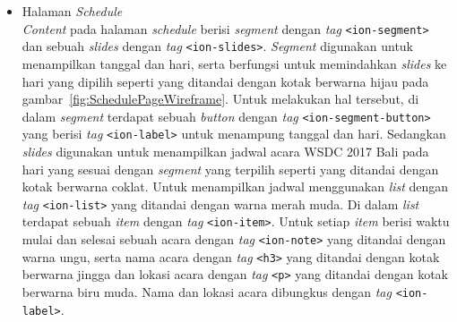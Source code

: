 \begin{enumerate}
\begin{itemize}
				\item Halaman \textit{Schedule} \\
					\textit{Content} pada halaman \textit{schedule} berisi \textit{segment} dengan \textit{tag} \texttt{<ion-segment>} dan sebuah \textit{slides} dengan \textit{tag} \texttt{<ion-slides>}. \textit{Segment} digunakan untuk menampilkan tanggal dan hari, serta berfungsi untuk memindahkan \textit{slides} ke hari yang dipilih seperti yang ditandai dengan kotak berwarna hijau pada gambar~\ref{fig:SchedulePageWireframe}. Untuk melakukan hal tersebut, di dalam \textit{segment} terdapat sebuah \textit{button} dengan \textit{tag} \texttt{<ion-segment-button>} yang berisi \textit{tag} \texttt{<ion-label>} untuk menampung tanggal dan hari. 
					Sedangkan \textit{slides} digunakan untuk menampilkan jadwal acara WSDC 2017 Bali pada hari yang sesuai dengan \textit{segment} yang terpilih seperti yang ditandai dengan kotak berwarna coklat. Untuk menampilkan jadwal menggunakan \textit{list} dengan \textit{tag} \texttt{<ion-list>} yang ditandai dengan warna merah muda. Di dalam \textit{list} terdapat sebuah \textit{item} dengan \textit{tag} \texttt{<ion-item>}. Untuk setiap \textit{item} berisi waktu mulai dan selesai sebuah acara dengan \textit{tag} \texttt{<ion-note>} yang ditandai dengan warna ungu, serta nama acara dengan \textit{tag} \texttt{<h3>} yang ditandai dengan kotak berwarna jingga dan lokasi acara dengan \textit{tag} \texttt{<p>} yang ditandai dengan kotak berwarna biru muda. Nama dan lokasi acara dibungkus dengan \textit{tag} \texttt{<ion-label>}.
					

\end{itemize}
\end{enumerate}
